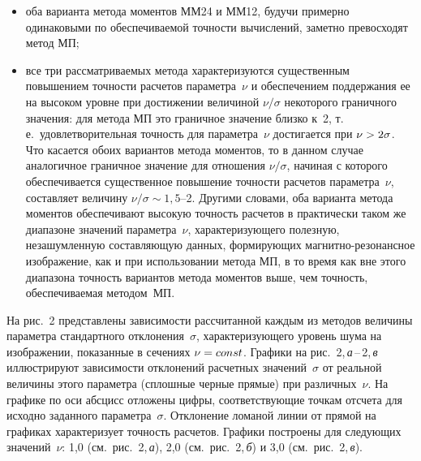 \begin{multicols}{2}

\noindent
\begin{itemize}
    \item оба варианта метода моментов ММ24 и ММ12, будучи примерно одинаковыми
по обеспечиваемой точности вычислений, заметно превосходят метод МП;\\[-15pt]
    \item все три рассматриваемых метода характеризуются существенным повышением
точности расчетов параметра~$\nu$ и обеспечением поддержания ее на высоком уровне
при достижении величиной $\nu/\sigma$ некоторого граничного значения:
для метода МП
это граничное значение близко к~2, т.\,е.\ удовлетворительная точность для
параметра~$\nu$ достигается при $\nu\hm>2\sigma$. Что касается обоих вариантов метода
моментов, то в данном случае аналогичное граничное значение для отношения
$\nu/\sigma$, начиная с которого обеспечивается существенное повышение точности
расчетов параметра~$\nu$, составляет величину $\nu/\sigma\sim 1{,}5$--2. Другими
словами, оба варианта метода моментов обеспечивают высокую точность расчетов в
практически таком же диапазоне значений параметра~$\nu$, характеризующего полезную,
незашумленную составляющую данных, формирующих маг\-нит\-но-ре\-зо\-нансное
изображение, как и при использовании метода МП, в то время как вне этого диапазона
точность вариантов метода моментов выше, чем точность, обеспечиваемая методом~МП.
\end{itemize}

     На рис.~2 представлены зависимости рассчитанной каждым из методов величины
параметра стандартного отклонения~$\sigma$, характеризующего уровень шума на
изображении, показанные в сечениях $\nu\hm=const$. Графики на
     рис.~2,\,\textit{а}\,--\,2,\,\textit{в} иллюстрируют зависимости отклонений расчетных
значений~$\sigma$ от реальной величины этого параметра
(сплошные черные прямые) при различных~$\nu$. На графике по оси абсцисс отложены
цифры, соответствующие точкам отсчета для исходно заданного параметра~$\sigma$.
Отклонение ломаной
линии от прямой на графиках характеризует точность расчетов. Графики построены для
следующих значений~$\nu$: 1,0 (см.\ рис.~2,\,\textit{а}), 2,0
(см.\ рис.~2,\,\textit{б}) и 3,0 (см.\ рис.~2,\,\textit{в}).


\end{multicols}
